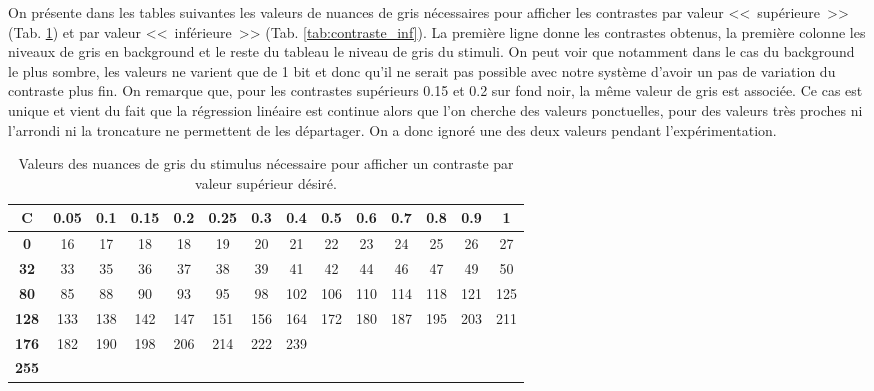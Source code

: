 	\par On présente dans les tables suivantes les valeurs de nuances de gris nécessaires pour afficher les contrastes par valeur <<~supérieure~>> (Tab. \ref{tab:contraste_sup}) et par valeur <<~inférieure~>> (Tab. \ref{tab:contraste_inf}). La première ligne donne les contrastes obtenus, la première colonne les niveaux de gris en background et le reste du tableau le niveau de gris du stimuli. On peut voir que notamment dans le cas du background le plus sombre, les valeurs ne varient que de 1 bit et donc qu'il ne serait pas possible avec notre système d'avoir un pas de variation du contraste plus fin. On remarque que, pour les contrastes supérieurs 0.15 et 0.2 sur fond noir, la même valeur de gris est associée. Ce cas est unique et vient du fait que la régression linéaire est continue alors que l'on cherche des valeurs ponctuelles, pour des valeurs très proches ni l'arrondi ni la troncature ne permettent de les départager. On a donc ignoré une des deux valeurs pendant l'expérimentation.
	
	\begin{table}[h]	
		\centering
		\caption{Valeurs des nuances de gris du stimulus nécessaire pour afficher un contraste par valeur supérieur désiré.}
		\label{tab:contraste_sup}
		\begin{tabular}{c|ccccccccccccc}
			\textbf{C} & \textbf{0.05} & \textbf{0.1} & \textbf{0.15} & \textbf{0.2} & \textbf{0.25} & \textbf{0.3} & \textbf{0.4} & \textbf{0.5} & \textbf{0.6} & \textbf{0.7} & \textbf{0.8} & \textbf{0.9} & \textbf{1}\\
			\hline
			\textbf{0} & 16  & 17  &  18  & 18 & 19 & 20 & 21 & 22 & 23 & 24 & 25 & 26 & 27\\
			\textbf{32} & 33 & 35 & 36 & 37 & 38 & 39 & 41 & 42 & 44 & 46 & 47 & 49 & 50\\
			\textbf{80} & 85 & 88 & 90 & 93 & 95 & 98 & 102 & 106 & 110 & 114 & 118 & 121 & 125\\
			\textbf{128} & 133 & 138 & 142 & 147 & 151 & 156 & 164 & 172 & 180 & 187 & 195 & 203 & 211\\
			\textbf{176} & 182 & 190 & 198 & 206 & 214 & 222 & 239\\
			\textbf{255}\\
		\end{tabular}
	\end{table}
	

